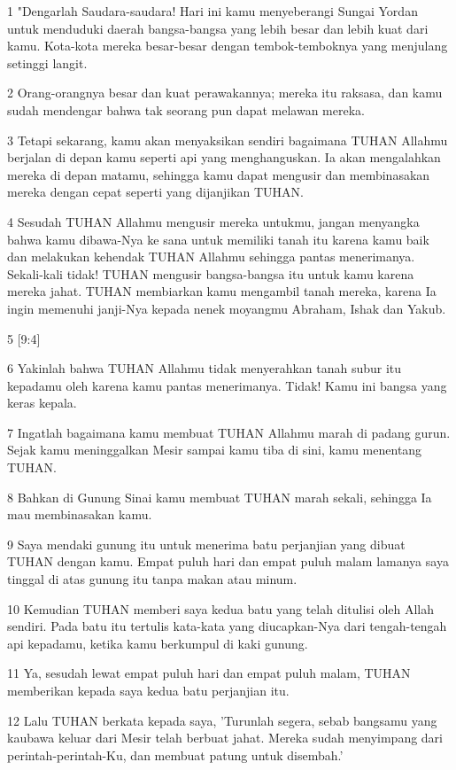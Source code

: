 \par 1 "Dengarlah Saudara-saudara! Hari ini kamu menyeberangi Sungai Yordan untuk menduduki daerah bangsa-bangsa yang lebih besar dan lebih kuat dari kamu. Kota-kota mereka besar-besar dengan tembok-temboknya yang menjulang setinggi langit.
\par 2 Orang-orangnya besar dan kuat perawakannya; mereka itu raksasa, dan kamu sudah mendengar bahwa tak seorang pun dapat melawan mereka.
\par 3 Tetapi sekarang, kamu akan menyaksikan sendiri bagaimana TUHAN Allahmu berjalan di depan kamu seperti api yang menghanguskan. Ia akan mengalahkan mereka di depan matamu, sehingga kamu dapat mengusir dan membinasakan mereka dengan cepat seperti yang dijanjikan TUHAN.
\par 4 Sesudah TUHAN Allahmu mengusir mereka untukmu, jangan menyangka bahwa kamu dibawa-Nya ke sana untuk memiliki tanah itu karena kamu baik dan melakukan kehendak TUHAN Allahmu sehingga pantas menerimanya. Sekali-kali tidak! TUHAN mengusir bangsa-bangsa itu untuk kamu karena mereka jahat. TUHAN membiarkan kamu mengambil tanah mereka, karena Ia ingin memenuhi janji-Nya kepada nenek moyangmu Abraham, Ishak dan Yakub.
\par 5 [9:4]
\par 6 Yakinlah bahwa TUHAN Allahmu tidak menyerahkan tanah subur itu kepadamu oleh karena kamu pantas menerimanya. Tidak! Kamu ini bangsa yang keras kepala.
\par 7 Ingatlah bagaimana kamu membuat TUHAN Allahmu marah di padang gurun. Sejak kamu meninggalkan Mesir sampai kamu tiba di sini, kamu menentang TUHAN.
\par 8 Bahkan di Gunung Sinai kamu membuat TUHAN marah sekali, sehingga Ia mau membinasakan kamu.
\par 9 Saya mendaki gunung itu untuk menerima batu perjanjian yang dibuat TUHAN dengan kamu. Empat puluh hari dan empat puluh malam lamanya saya tinggal di atas gunung itu tanpa makan atau minum.
\par 10 Kemudian TUHAN memberi saya kedua batu yang telah ditulisi oleh Allah sendiri. Pada batu itu tertulis kata-kata yang diucapkan-Nya dari tengah-tengah api kepadamu, ketika kamu berkumpul di kaki gunung.
\par 11 Ya, sesudah lewat empat puluh hari dan empat puluh malam, TUHAN memberikan kepada saya kedua batu perjanjian itu.
\par 12 Lalu TUHAN berkata kepada saya, 'Turunlah segera, sebab bangsamu yang kaubawa keluar dari Mesir telah berbuat jahat. Mereka sudah menyimpang dari perintah-perintah-Ku, dan membuat patung untuk disembah.'
